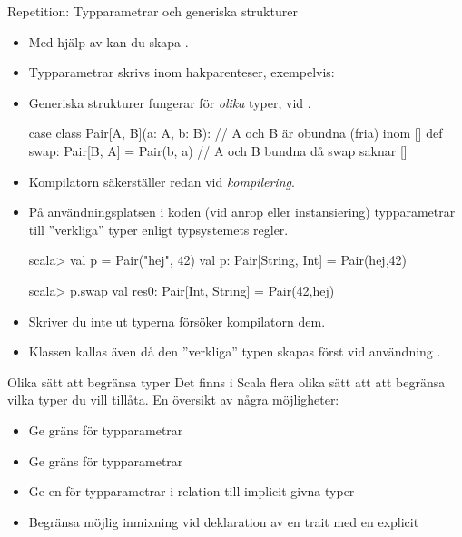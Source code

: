 



\begin{Slide}{Repetition: Typparametrar och generiska strukturer}
\begin{itemize}\SlideFontSmall
\item Med hjälp av   kan du skapa  .
\item Typparametrar skrivs inom hakparenteser, exempelvis: \code{ [T, U] }
\item Generiska strukturer fungerar för \emph{olika} typer,  vid . 
\begin{Code}
case class Pair[A, B](a: A, b: B):  // A och B är obundna (fria) inom []
  def swap: Pair[B, A] = Pair(b, a) // A och B bundna då swap saknar []
\end{Code}
\pause
\item Kompilatorn säkerställer   redan vid \emph{kompilering}.
\item På användningsplatsen i koden (vid anrop eller instansiering)  typparametrar till ''verkliga'' typer enligt typsystemets regler. 
\begin{REPL}
scala> val p = Pair("hej", 42)
val p: Pair[String, Int] = Pair(hej,42)

scala> p.swap
val res0: Pair[Int, String] = Pair(42,hej)
\end{REPL}
\pause
\item Skriver du inte ut typerna försöker kompilatorn   dem.
\item Klassen  kallas även   då den ''verkliga'' typen skapas först vid användning .
\end{itemize}
\end{Slide}



\begin{Slide}{Olika sätt att begränsa typer}
Det finns i Scala flera olika sätt att att begränsa vilka typer du vill tillåta. En översikt av några möjligheter:
\begin{itemize}
  \item Ge  gräns för typparametrar 
  \item Ge  gräns för typparametrar 
  \item Ge en  för typparametrar i relation till implicit givna typer 
  \item Begränsa möjlig inmixning vid deklaration av en trait med en explicit   
\end{itemize}
\end{Slide}

